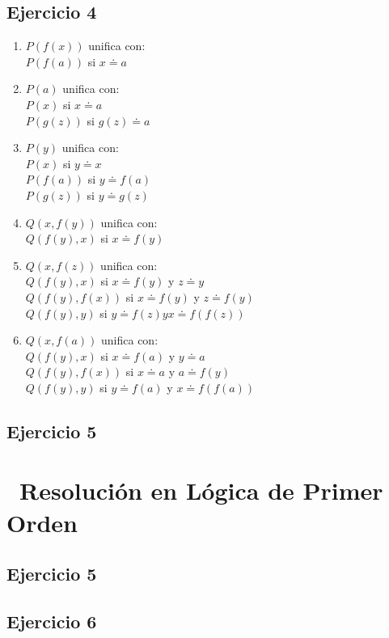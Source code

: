 \documentclass[10pt,a4paper]{article}
\begin{document}
  \subsection{Ejercicio 4}
    \begin{enumerate}
    \item $P(f(x)) $ unifica con: \\
    $P(f(a)) $ si $ x \doteq a$
    \item $P(a) $ unifica con: \\
    $P(x) $ si $ x \doteq a$ \\
    $P(g(z)) $ si $ g(z) \doteq a$
    \item $P(y) $ unifica con: \\
    $P(x) $ si $ y \doteq x$ \\
    $P(f(a)) $ si $ y \doteq f(a)$ \\
    $P(g(z)) $ si $ y \doteq g(z)$
    \item $Q(x,f(y)) $ unifica con: \\
    $Q(f(y),x) $ si $ x \doteq f(y)$
    \item $Q(x,f(z)) $ unifica con: \\
    $Q(f(y),x) $ si $ x \doteq f(y) $ y $ z \doteq y$ \\
    $Q(f(y),f(x)) $ si $ x \doteq f(y) $ y $ z \doteq f(y)$ \\
    $Q(f(y),y) $ si $ y \doteq f(z) y x \doteq f(f(z))$
    \item $Q(x,f(a)) $ unifica con: \\
    $Q(f(y),x) $ si $ x \doteq f(a) $ y $ y \doteq a$ \\
    $Q(f(y),f(x)) $ si $ x \doteq a $ y $ a \doteq f(y)$ \\
    $Q(f(y),y) $ si $ y \doteq f(a) $ y $ x \doteq f(f(a))$
    \end{enumerate}
  \subsection{Ejercicio 5}
  \section*{\ Resolución en Lógica de Primer Orden}
  \subsection{Ejercicio 5}
  \subsection{Ejercicio 6}
\end{document}
